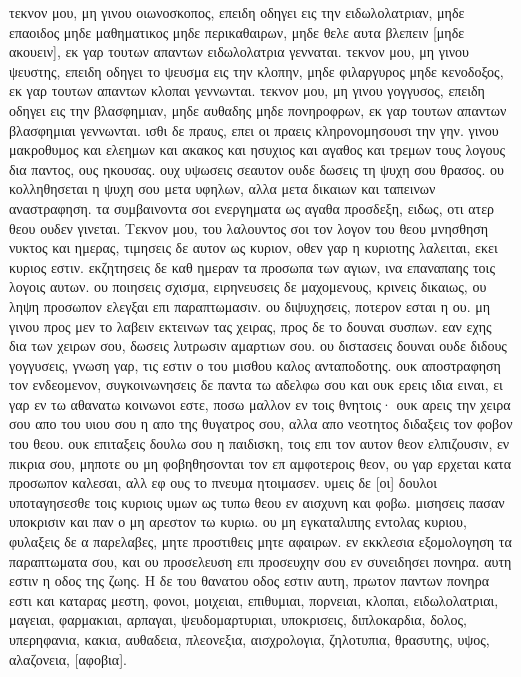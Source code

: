 τεκνον μου, μη γινου οιωνοσκοπος, επειδη οδηγει εις την ειδωλολατριαν, μηδε επαοιδος μηδε μαθηματικος μηδε περικαθαιρων, μηδε θελε αυτα βλεπειν [μηδε ακουειν], εκ γαρ τουτων απαντων ειδωλολατρια γενναται.
τεκνον μου, μη γινου ψευστης, επειδη οδηγει το ψευσμα εις την κλοπην, μηδε φιλαργυρος μηδε κενοδοξος, εκ γαρ τουτων απαντων κλοπαι γεννωνται.
τεκνον μου, μη γινου γογγυσος, επειδη οδηγει εις την βλασφημιαν, μηδε αυθαδης μηδε πονηροφρων, εκ γαρ τουτων απαντων βλασφημιαι γεννωνται.
ισθι δε πραυς, επει οι πραεις κληρονομησουσι την γην.
γινου μακροθυμος και ελεημων και ακακος και ησυχιος και αγαθος και τρεμων τους λογους δια παντος, ους ηκουσας.
ουχ υψωσεις σεαυτον ουδε δωσεις τη ψυχη σου θρασος. ου κολληθησεται η ψυχη σου μετα υφηλων, αλλα μετα δικαιων και ταπεινων αναστραφηση.
τα συμβαινοντα σοι ενεργηματα ως αγαθα προσδεξη, ειδως, οτι ατερ θεου ουδεν γινεται.
Τεκνον μου, του λαλουντος σοι τον λογον του θεου μνησθηση νυκτος και ημερας, τιμησεις δε αυτον ως κυριον, οθεν γαρ η κυριοτης λαλειται, εκει κυριος εστιν.
εκζητησεις δε καθ ημεραν τα προσωπα των αγιων, ινα επαναπαης τοις λογοις αυτων.
ου ποιησεις σχισμα, ειρηνευσεις δε μαχομενους, κρινεις δικαιως, ου ληψη προσωπον ελεγξαι επι παραπτωμασιν.
ου διψυχησεις, ποτερον εσται η ου.
μη γινου προς μεν το λαβειν εκτεινων τας χειρας, προς δε το δουναι συσπων.
εαν εχης δια των χειρων σου, δωσεις λυτρωσιν αμαρτιων σου.
ου διστασεις δουναι ουδε διδους γογγυσεις, γνωση γαρ, τις εστιν ο του μισθου καλος ανταποδοτης.
ουκ αποστραφηση τον ενδεομενον, συγκοινωνησεις δε παντα τω αδελφω σου και ουκ ερεις ιδια ειναι, ει γαρ εν τω αθανατω κοινωνοι εστε, ποσω μαλλον εν τοις θνητοις·
ουκ αρεις την χειρα σου απο του υιου σου η απο της θυγατρος σου, αλλα απο νεοτητος διδαξεις τον φοβον του θεου.
ουκ επιταξεις δουλω σου η παιδισκη, τοις επι τον αυτον θεον ελπιζουσιν, εν πικρια σου, μηποτε ου μη φοβηθησονται τον επ αμφοτεροις θεον, ου γαρ ερχεται κατα προσωπον καλεσαι, αλλ εφ ους το πνευμα ητοιμασεν.
υμεις δε [οι] δουλοι υποταγησεσθε τοις κυριοις υμων ως τυπω θεου εν αισχυνη και φοβω.
μισησεις πασαν υποκρισιν και παν ο μη αρεστον τω κυριω.
ου μη εγκαταλιπης εντολας κυριου, φυλαξεις δε α παρελαβες, μητε προστιθεις μητε αφαιρων.
εν εκκλεσια εξομολογηση τα παραπτωματα σου, και ου προσελευση επι προσευχην σου εν συνειδησει πονηρα. αυτη εστιν η οδος της ζωης.
Η δε του θανατου οδος εστιν αυτη, πρωτον παντων πονηρα εστι και καταρας μεστη, φονοι, μοιχειαι, επιθυμιαι, πορνειαι, κλοπαι, ειδωλολατριαι, μαγειαι, φαρμακιαι, αρπαγαι, ψευδομαρτυριαι, υποκρισεις, διπλοκαρδια, δολος, υπερηφανια, κακια, αυθαδεια, πλεονεξια, αισχρολογια, ζηλοτυπια, θρασυτης, υψος, αλαζονεια, [αφοβια].
